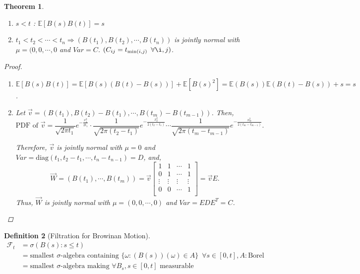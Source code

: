 \documentclass[12pt]{report}
\newcommand{\F}{\mathcal{F}}
\newcommand{\E}{\mathbb{E}}
\renewcommand{\1}{\mathbb{1}}
\theoremstyle{break}
\newtheorem{thm}{Theorem}[section] %
\theoremstyle{newdef}
\newtheorem{defn}[thm]{Definition} %
\theoremstyle{remark}
\begin{document}
\begin{thm}
\leavevmode
\vspace{-6mm}
\begin{enumerate}
\item $s < t$ : $\E[B(s)B(t)] = s$
\item $t_1 < t_2 < \cdots < t_n \Rightarrow (B(t_1), B(t_2), \cdots, B(t_n))$ is jointly normal with $\mu = (0,0,\cdots,0$ and $Var = C$.
$(C_{ij} = t_{\min(i,j)} \enspace \forall \i,j)$.
\end{enumerate}

\begin{proof}
\leavevmode
\begin{enumerate}
\item
$\E[B(s)B(t)] = \E[B(s)(B(t)-B(s))] + \E[B(s)^2]
= \E(B(s))\E(B(t)-B(s)) + s = s$.

\item
Let $\vec{v} = (B(t_1), B(t_2)-B(t_1),\cdots,B(t_m)-B(t_{m-1}))$. Then,
$$
\text{PDF of } \vec{v}
= \frac{1}{\sqrt{2\pi t_1}}e^{-\frac{x_1^2}{2t_1}} \cdot \frac{1}{\sqrt{2\pi (t_2 - t_1)}}e^{-\frac{x_2^2}{2(t_2-t_1)}} \cdots \frac{1}{\sqrt{2\pi (t_m-t_{m-1})}}e^{-\frac{x_m^2}{2(t_m-t_{m-1})}}.
$$

Therefore, $\vec{v}$ is jointly normal with $\mu = 0$ and $Var = \text{diag}(t_1, t_2-t_1, \cdots, t_n-t_{n-1}) = D$, and,
$$
\vec{W}
= (B(t_1), \cdots, B(t_m))
= \vec{v}
\begin{bmatrix}
1 & 1 &\cdots &1\\
0 & 1 &\cdots &1\\
\vdots & \vdots & \vdots & \vdots\\
0 & 0 &\cdots &1\\
\end{bmatrix}
= \vec{v}E.
$$
Thus, $\vec{W}$ is jointly normal with $\mu = (0,0,\cdots,0)$ and $Var = EDE^T = C$.
\end{enumerate}
\end{proof}
\end{thm}


\begin{defn}[Filtration for Browinan Motion]
$$
\begin{aligned}
\F_t &= \sigma(B(s) : s \leq t)\\
&= \text{smallest } \sigma\text{-algebra containing } \{\omega: (B(s))(\omega) \in A\} \enspace \forall s \in [0,t], A: \text{Borel}\\
&= \text{smallest } \sigma\text{-algebra making } \forall B_s, s\in[0,t] \text{ measurable}
\end{aligned}
$$
\end{defn}
\end{document}
